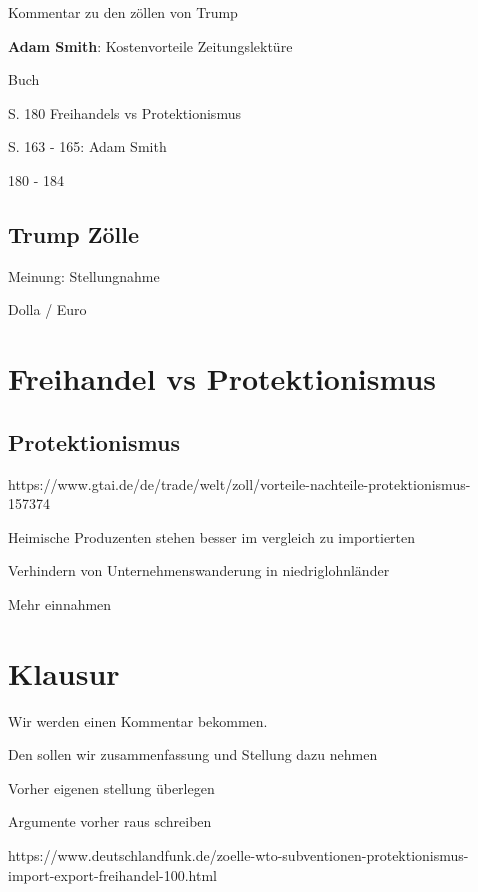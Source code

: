Kommentar zu den zöllen von Trump

{\bf Adam Smith}: Kostenvorteile
Zeitungslektüre


\startframedtipp
Buch

\startitemize[packed]
\item S. 180 Freihandels vs Protektionismus
\item S. 163 - 165: Adam Smith
\item 180 - 184
\stopitemize
\stopframedtipp



\subsection{Trump Zölle}

Meinung: Stellungnahme

Dolla / Euro

\section{Freihandel vs Protektionismus}

\subsection{Protektionismus }

https://www.gtai.de/de/trade/welt/zoll/vorteile-nachteile-protektionismus-157374

\startitemize[packed]
\item Heimische Produzenten stehen besser im vergleich zu importierten
\item Verhindern von Unternehmenswanderung in niedriglohnländer
\item Mehr einnahmen
\stopitemize

\section{Klausur}

Wir werden einen Kommentar bekommen.

Den sollen wir zusammenfassung und Stellung dazu nehmen
\startitemize[packed]
\item Vorher eigenen stellung überlegen
\item Argumente vorher raus schreiben
\stopitemize

\startitemize[packed]
\item https://www.deutschlandfunk.de/zoelle-wto-subventionen-protektionismus-import-export-freihandel-100.html
\stopitemize

